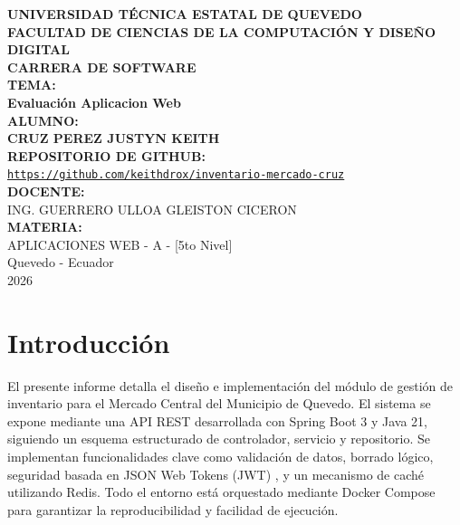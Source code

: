\documentclass[12pt]{article}
\begin{document}
\begin{titlepage}
\begin{center}
    {\large \textbf{UNIVERSIDAD TÉCNICA ESTATAL DE QUEVEDO}} \\[0.5cm]
    {\large \textbf{FACULTAD DE CIENCIAS DE LA COMPUTACIÓN Y DISEÑO DIGITAL}} \\[0.5cm]
    {\large \textbf{CARRERA DE SOFTWARE}} \\[2cm]
    
    \textbf{TEMA:}\\[0.5cm]
    {\Large \textbf{Evaluación Aplicacion Web}} \\[1cm]
    
    \textbf{ALUMNO:}\\[0.5cm]
    \textbf{CRUZ PEREZ JUSTYN KEITH} \\[1cm]

    \textbf{REPOSITORIO DE GITHUB:}\\[0.3cm]
    \href{https://github.com/keithdrox/inventario-mercado-cruz}{\texttt{https://github.com/keithdrox/inventario-mercado-cruz}} \\[1cm]
    
    \textbf{DOCENTE:}\\[0.5cm]
    ING. GUERRERO ULLOA GLEISTON CICERON\\[1cm]
    
    \textbf{MATERIA:}\\[0.5cm]
    APLICACIONES WEB - A - [5to Nivel] \\[1cm]
    
    \vfill
    Quevedo - Ecuador \\
    2026
\end{center}
\end{titlepage}

\newpage
\tableofcontents
\newpage

\section{Introducción}
El presente informe detalla el diseño e implementación del módulo de gestión de inventario para el Mercado Central del Municipio de Quevedo. El sistema se expone mediante una API REST desarrollada con Spring Boot 3 y Java 21, siguiendo un esquema estructurado de controlador, servicio y repositorio. Se implementan funcionalidades clave como validación de datos, borrado lógico, seguridad basada en JSON Web Tokens (JWT) \cite{jwt}, y un mecanismo de caché utilizando Redis. Todo el entorno está orquestado mediante Docker Compose para garantizar la reproducibilidad y facilidad de ejecución.
\end{document}
